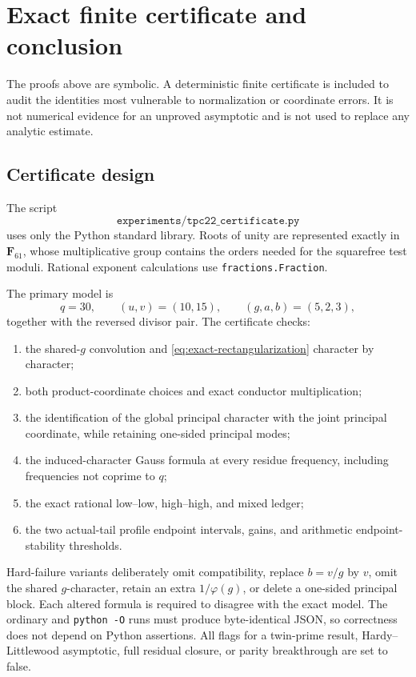 \section{Exact finite certificate and conclusion}
\label{sec:certificate-conclusion}

The proofs above are symbolic.  A deterministic finite certificate is
included to audit the identities most vulnerable to normalization or
coordinate errors.  It is not numerical evidence for an unproved
asymptotic and is not used to replace any analytic estimate.

\subsection{Certificate design}

The script
\[
 \texttt{experiments/tpc22\_certificate.py}
\]
uses only the Python standard library.  Roots of unity are represented
exactly in \(\mathbf F_{61}\), whose multiplicative group contains the
orders needed for the squarefree test moduli.  Rational exponent
calculations use \texttt{fractions.Fraction}.

The primary model is
\[
 q=30,\qquad (u,v)=(10,15),\qquad (g,a,b)=(5,2,3),
\]
together with the reversed divisor pair.  The certificate checks:
\begin{enumerate}[label=\textup{(\arabic*)}]
 \item the shared-\(g\) convolution and
 \eqref{eq:exact-rectangularization} character by character;
 \item both product-coordinate choices and exact conductor
 multiplication;
 \item the identification of the global principal character with the
 joint principal coordinate, while retaining one-sided principal modes;
 \item the induced-character Gauss formula at every residue frequency,
 including frequencies not coprime to \(q\);
 \item the exact rational low--low, high--high, and mixed ledger;
 \item the two actual-tail profile endpoint intervals, gains, and
 arithmetic endpoint-stability thresholds.
\end{enumerate}

Hard-failure variants deliberately omit compatibility, replace
\(b=v/g\) by \(v\), omit the shared \(g\)-character, retain an extra
\(1/\varphi(g)\), or delete a one-sided principal block.  Each altered
formula is required to disagree with the exact model.  The ordinary and
\texttt{python -O} runs must produce byte-identical JSON, so correctness
does not depend on Python assertions.  All flags for a twin-prime
result, Hardy--Littlewood asymptotic, full residual closure, or parity
breakthrough are set to false.

